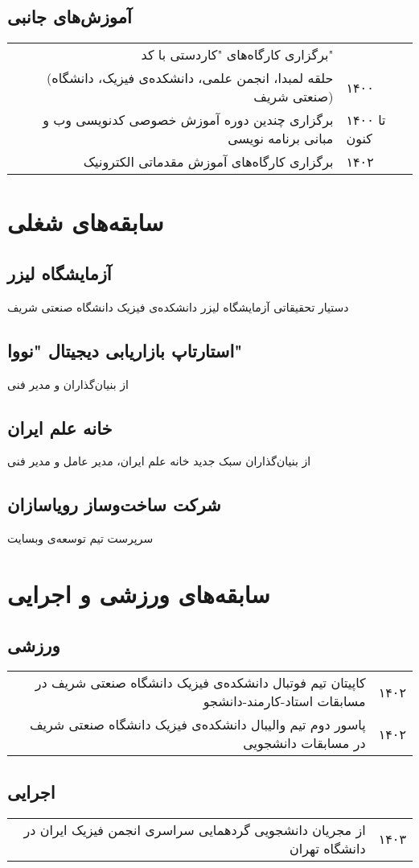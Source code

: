 \documentclass{persian-resume}
\begin{document}
\subsection*{
    آموزش‌های جانبی
}

\begin{tabular*}{\textwidth}{@{\extracolsep{\fill}} rl}
برگزاری کارگاه‌های "کاردستی با کد"\\ (حلقه لمبدا، انجمن علمی، دانشکده‌ی فیزیک‌، دانشگاه صنعتی شریف) & ۱۴۰۰\\
برگزاری چندین دوره آموزش خصوصی کدنویسی وب و مبانی برنامه نویسی & ۱۴۰۰ تا کنون\\
برگزاری کارگاه‌های آموزش مقدماتی الکترونیک & ۱۴۰۲
\end{tabular*}

\section{
    سابقه‌های شغلی
}
\subsection*{
آزمایشگاه لیزر
}
دستیار تحقیقاتی آزمایشگاه لیزر دانشکده‌ی فیزیک دانشگاه صنعتی شریف

\subsection*{
استارتاپ بازاریابی دیجیتال "نووا"
}
از بنیان‌گذاران و مدیر فنی

\subsection*{
خانه علم ایران
}
از بنیان‌گذاران سبک جدید خانه علم ایران، مدیر عامل و مدیر فنی

\subsection*{
شرکت ساخت‌وساز رویاسازان
}
سرپرست تیم توسعه‌ی وبسایت

\section{
    سابقه‌های ورزشی و اجرایی
}
\subsection*{
    ورزشی
}
\begin{tabular*}{\textwidth}{@{\extracolsep{\fill}} rl}
کاپیتان تیم فوتبال دانشکده‌ی فیزیک دانشگاه صنعتی شریف در مسابقات استاد-کارمند-دانشجو & ۱۴۰۲\\
پاسور دوم تیم والیبال دانشکده‌ی فیزیک دانشگاه صنعتی شریف در مسابقات دانشجویی & ۱۴۰۲
\end{tabular*}
\subsection*{
    اجرایی
}
\begin{tabular*}{\textwidth}{@{\extracolsep{\fill}} rl}
از مجریان دانشجویی گردهمایی سراسری انجمن فیزیک ایران در دانشگاه تهران & ۱۴۰۳
\end{tabular*}
\end{document}
